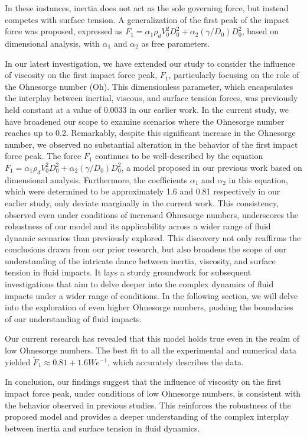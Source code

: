 \documentclass[]{article}
\begin{document}
In these instances, inertia does not act as the sole governing force, but instead competes with surface tension. A generalization of the first peak of the impact force was proposed, expressed as $F_1 = \alpha_1\rho_d V_0^2 D_0^2 + \alpha_2(\gamma/ D_0) D_0^2$, based on dimensional analysis, with $\alpha_1$ and $\alpha_2$ as free parameters.

In our latest investigation, we have extended our study to consider the influence of viscosity on the first impact force peak, $F_1$, particularly focusing on the role of the Ohnesorge number (Oh). This dimensionless parameter, which encapsulates the interplay between inertial, viscous, and surface tension forces, was previously held constant at a value of 0.0033 in our earlier work.
In the current study, we have broadened our scope to examine scenarios where the Ohnesorge number reaches up to 0.2. Remarkably, despite this significant increase in the Ohnesorge number, we observed no substantial alteration in the behavior of the first impact force peak. The force $F_1$ continues to be well-described by the equation $F_1 = \alpha_1\rho_d V_0^2 D_0^2 + \alpha_2(\gamma/ D_0) D_0^2$, a model proposed in our previous work based on dimensional analysis.
Furthermore, the coefficients $\alpha_1$ and $\alpha_2$ in this equation, which were determined to be approximately 1.6 and 0.81 respectively in our earlier study, only deviate marginally in the current work. This consistency, observed even under conditions of increased Ohnesorge numbers, underscores the robustness of our model and its applicability across a wider range of fluid dynamic scenarios than previously explored.
This discovery not only reaffirms the conclusions drawn from our prior research, but also broadens the scope of our understanding of the intricate dance between inertia, viscosity, and surface tension in fluid impacts. It lays a sturdy groundwork for subsequent investigations that aim to delve deeper into the complex dynamics of fluid impacts under a wider range of conditions.  In the following section, we will delve into the exploration of even higher Ohnesorge numbers, pushing the boundaries of our understanding of fluid impacts.

Our current research has revealed that this model holds true even in the realm of low Ohnesorge numbers. The best fit to all the experimental and numerical data yielded $\tilde{F}_1 \approx 0.81 + 1.6We^{-1}$, which accurately describes the data.

In conclusion, our findings suggest that the influence of viscosity on the first impact force peak, under conditions of low Ohnesorge numbers, is consistent with the behavior observed in previous studies. This reinforces the robustness of the proposed model and provides a deeper understanding of the complex interplay between inertia and surface tension in fluid dynamics.
\end{document}

